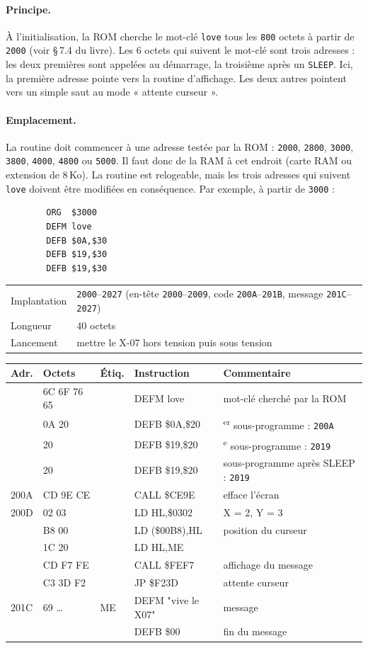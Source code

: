 \documentclass[a4paper,10pt]{article}
\makeatletter
\newcommand{\hex}[1]{\texttt{#1}}
\newcommand{\fiche}[3]{%
  \begin{center}\small
  \begin{tabular}{@{}ll@{}}
  \toprule
  Implantation & #1 \\
  Longueur & #2 \\
  Lancement & #3 \\
  \bottomrule
  \end{tabular}
  \end{center}}
\newenvironment{asm}
  {\small\begin{longtable}{@{}>{\ttfamily}l>{\ttfamily}l>{\ttfamily}l>{\ttfamily}l>{\raggedright\arraybackslash}p{6.2cm}@{}}
   \toprule
   \normalfont\bfseries Adr. & \normalfont\bfseries Octets & \normalfont\bfseries Étiq. & \normalfont\bfseries Instruction & \textbf{Commentaire}\\
   \midrule\endhead
   \bottomrule\endfoot}
  {\end{longtable}}
\makeatother
\begin{document}
\paragraph{Principe.} À l'initialisation, la ROM cherche le mot-clé
\texttt{love} tous les \hex{800} octets à partir de \hex{2000} (voir
§\,7.4 du livre). Les 6 octets qui suivent le mot-clé sont trois adresses :
les deux premières sont appelées au démarrage, la troisième après un
\texttt{SLEEP}. Ici, la première adresse pointe vers la routine
d'affichage. Les deux autres pointent vers un simple saut au mode
« attente curseur ».

\paragraph{Emplacement.} La routine doit commencer à une adresse testée par
la ROM : \hex{2000}, \hex{2800}, \hex{3000}, \hex{3800}, \hex{4000},
\hex{4800} ou \hex{5000}. Il faut donc de la RAM à cet endroit (carte RAM
ou extension de 8\,Ko). La routine est relogeable, mais les trois adresses
qui suivent \texttt{love} doivent être modifiées en conséquence. Par
exemple, à partir de \hex{3000} :
\begin{verbatim}
        ORG  $3000
        DEFM love
        DEFB $0A,$30
        DEFB $19,$30
        DEFB $19,$30
\end{verbatim}

\fiche{\hex{2000}--\hex{2027} (en-tête \hex{2000}--\hex{2009}, code
\hex{200A}--\hex{201B}, message \hex{201C}--\hex{2027})}%
      {40 octets}{mettre le X-07 hors tension puis sous tension}

\begin{asm}
2000 & 6C 6F 76 65 &    & DEFM love      & mot-clé cherché par la ROM \\
2004 & 0A 20    &    & DEFB \$0A,\$20 & 1\textsuperscript{er} sous-programme : \hex{200A} \\
2006 & 19 20    &    & DEFB \$19,\$20 & 2\textsuperscript{e} sous-programme : \hex{2019} \\
2008 & 19 20    &    & DEFB \$19,\$20 & sous-programme après SLEEP : \hex{2019} \\
200A & CD 9E CE &    & CALL \$CE9E    & efface l'écran \\
200D & 21 02 03 &    & LD HL,\$0302   & X = 2, Y = 3 \\
2010 & 22 B8 00 &    & LD (\$00B8),HL & position du curseur \\
2013 & 21 1C 20 &    & LD HL,ME       & \\
2016 & CD F7 FE &    & CALL \$FEF7    & affichage du message \\
2019 & C3 3D F2 &    & JP \$F23D      & attente curseur \\
201C & 76 69 \dots & ME & DEFM "vive le X07" & message \\
2027 & 00       &    & DEFB \$00      & fin du message \\
\end{asm}
\end{document}

